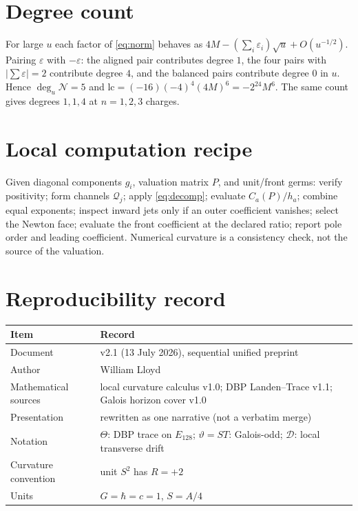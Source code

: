 \documentclass[11pt,a4paper]{article}
\theoremstyle{definition}
\theoremstyle{remark}
\begin{document}
\section{Degree count}
\label{app:degree}

For large \(u\) each factor of \eqref{eq:norm} behaves as
\(4M-(\sum_i\varepsilon_i)\sqrt u+O(u^{-1/2})\). Pairing \(\varepsilon\) with
\(-\varepsilon\): the aligned pair contributes degree \(1\), the four pairs with
\(|\sum\varepsilon|=2\) contribute degree \(4\), and the balanced pairs
contribute degree \(0\) in \(u\). Hence \(\deg_u\mathcal N=5\) and
\(\mathrm{lc}=(-16)(-4)^4(4M)^6=-2^{24}M^6\). The same count gives degrees
\(1,1,4\) at \(n=1,2,3\) charges.

\section{Local computation recipe}
\label{app:recipe}

Given diagonal components \(g_i\), valuation matrix \(P\), and unit/front germs:
verify positivity; form channels \(\mathcal Q_j\); apply \eqref{eq:decomp};
evaluate \(C_a(P)/h_a\); combine equal exponents; inspect inward jets only if an
outer coefficient vanishes; select the Newton face; evaluate the front
coefficient at the declared ratio; report pole order and leading coefficient.
Numerical curvature is a consistency check, not the source of the valuation.

\section{Reproducibility record}
\label{app:repro}

\begin{center}
\begin{tabular}{@{}ll@{}}
\toprule
Item & Record\\
\midrule
Document & v2.1 (13 July 2026), sequential unified preprint\\
Author & William Lloyd\\
Mathematical sources & local curvature calculus v1.0; DBP Landen--Trace v1.1;
  Galois horizon cover v1.0\\
Presentation & rewritten as one narrative (not a verbatim merge)\\
Notation & \(\Theta\): DBP trace on \(E_{128}\); \(\vartheta=ST\): Galois-odd;
  \(\mathcal D\): local transverse drift\\
Curvature convention & unit \(S^2\) has \(R=+2\)\\
Units & \(G=\hbar=c=1\), \(S=A/4\)\\
\bottomrule
\end{tabular}
\end{center}
\end{document}
